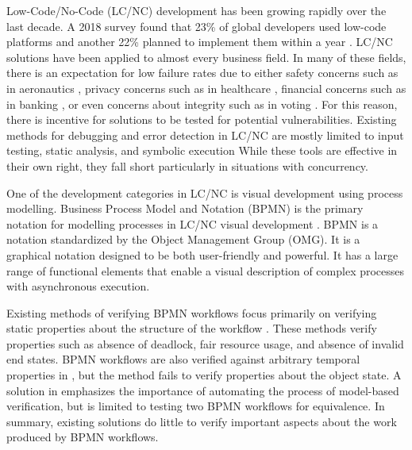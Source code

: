Low-Code/No-Code (LC/NC) development has been growing rapidly over the last decade. A 2018 survey found that 23\% of global developers used low-code platforms and another 22\% planned to implement them within a year \cite{LowCodeSurvey}. LC/NC solutions have been applied to almost every business field. In many of these fields, there is an expectation for low failure rates due to either safety concerns such as in aeronautics \cite{aeronautics1, aeronautics2}, privacy concerns such as in healthcare \cite{healthcare1, healthcare2}, financial concerns such as in banking \cite{banking1,banking2}, or even concerns about integrity such as in voting \cite{voting1, voting2}. For this reason, there is incentive for solutions to be tested for potential vulnerabilities. Existing methods for debugging and error detection in LC/NC are mostly limited to input testing, static analysis, and symbolic execution \cite{LCTesting, BPMNSimulation1} While these tools are effective in their own right, they fall short particularly in situations with concurrency.

One of the development categories in LC/NC is visual development using process modelling. Business Process Model and Notation (BPMN)\cite{BPMN} is the primary notation for modelling processes in LC/NC visual development \cite{BPMNusage}. BPMN is a notation standardized by the Object Management Group (OMG). It is a graphical notation designed to be both user-friendly and powerful. It has a large range of functional elements that enable a visual description of complex processes with asynchronous execution.

Existing methods of verifying BPMN workflows focus primarily on verifying static properties about the structure of the workflow \cite{bpmnVerification1, bpmnVerification2, ASMverification}. These methods verify properties such as absence of deadlock, fair resource usage, and absence of invalid end states. BPMN workflows are also verified against arbitrary temporal properties in \cite{bpmnVerification3}, but the method fails to verify properties about the object state. A solution in \cite{bpmnVerification4} emphasizes the importance of automating the process of model-based verification, but is limited to testing two BPMN workflows for equivalence. In summary, existing solutions do little to verify important aspects about the work produced by BPMN workflows.

